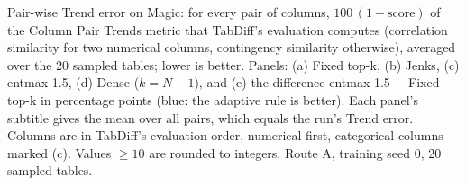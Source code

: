 Pair-wise Trend error on Magic: for every pair of columns, $100\,(1-\text{score})$ of the Column Pair Trends metric that TabDiff's evaluation computes (correlation similarity for two numerical columns, contingency similarity otherwise), averaged over the 20 sampled tables; lower is better. Panels: (a) Fixed top-k, (b) Jenks, (c) entmax-1.5, (d) Dense ($k = N-1$), and (e) the difference entmax-1.5 $-$ Fixed top-k in percentage points (blue: the adaptive rule is better). Each panel's subtitle gives the mean over all pairs, which equals the run's Trend error. Columns are in TabDiff's evaluation order, numerical first, categorical columns marked (c). Values $\geq 10$ are rounded to integers. Route A, training seed 0, 20 sampled tables.
